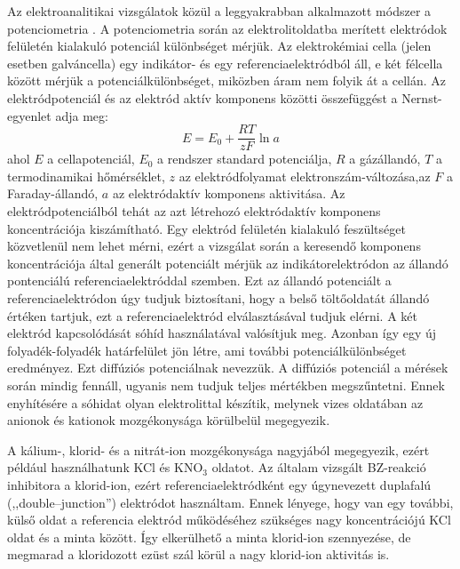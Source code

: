 Az elektroanalitikai vizsgálatok közül a leggyakrabban alkalmazott módszer a potenciometria \cite{erdey1967}. A potenciometria során az elektrolitoldatba merített elektródok felületén kialakuló potenciál különbséget mérjük. Az elektrokémiai cella (jelen esetben galváncella) egy indikátor- és egy referenciaelektródból áll, e két félcella között mérjük a potenciálkülönbséget, miközben áram nem folyik át a cellán. Az elektródpotenciál és az elektród aktív komponens közötti összefüggést a Nernst-egyenlet adja meg:
\begin{equation}
E = E_\text{0} + \frac{RT}{zF} \ln a
\end{equation}
ahol $E$ a cellapotenciál, $E_\text{0}$ a rendszer standard potenciálja, $R$ a gázállandó, $T$ a termodinamikai hőmérséklet, $z$ az elektródfolyamat elektronszám-változása,az $F$ a Faraday-állandó, $a$ az elektródaktív komponens aktivitása.
Az elektródpotenciálból tehát az azt létrehozó elektródaktív komponens koncentrációja kiszámítható. Egy elektród felületén kialakuló feszültséget közvetlenül nem lehet mérni, ezért a vizsgálat során a keresendő komponens koncentrációja által generált potenciált mérjük az indikátorelektródon az állandó pontenciálú referenciaelektróddal szemben. Ezt az állandó potenciált a referenciaelektródon úgy tudjuk biztosítani, hogy a belső töltőoldatát állandó értéken tartjuk, ezt a referenciaelektród elválasztásával tudjuk elérni. A két elektród kapcsolódását sóhíd használatával valósítjuk meg. Azonban így egy új folyadék-folyadék határfelület jön létre, ami további potenciálkülönbséget eredményez. Ezt diffúziós potenciálnak nevezzük. A diffúziós potenciál a mérések során mindig fennáll, ugyanis nem tudjuk teljes mértékben megszűntetni. Ennek enyhítésére a sóhidat olyan elektrolittal készítik, melynek vizes oldatában az anionok és kationok mozgékonysága körülbelül megegyezik.

A kálium-, klorid- és a nitrát-ion mozgékonysága nagyjából megegyezik, ezért például használhatunk KCl és KNO$_3$ oldatot. Az általam vizsgált BZ-reakció inhibitora a klorid-ion, ezért referenciaelektródként egy úgynevezett duplafalú (,,double--junction'') elektródot használtam. Ennek lényege, hogy van egy további, külső oldat a referencia elektród működéséhez szükséges nagy koncentrációjú KCl oldat és a minta között. Így elkerülhető a minta klorid-ion szennyezése, de megmarad a kloridozott ezüst szál körül a nagy klorid-ion aktivitás is.

